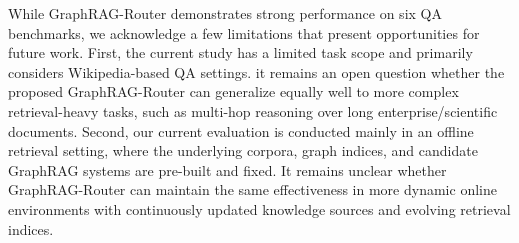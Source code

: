 While GraphRAG-Router demonstrates strong performance on six QA benchmarks, we acknowledge a few limitations that present opportunities for future work. First, the current study has a limited task scope and primarily considers Wikipedia-based QA settings. it remains an open question whether the proposed GraphRAG-Router can generalize equally well to more complex retrieval-heavy tasks, such as multi-hop reasoning over long enterprise/scientific documents. Second, our current evaluation is conducted mainly in an offline retrieval setting, where the underlying corpora, graph indices, and candidate GraphRAG systems are pre-built and fixed. It remains unclear whether GraphRAG-Router can maintain the same effectiveness in more dynamic online environments with continuously updated knowledge sources and evolving retrieval indices.